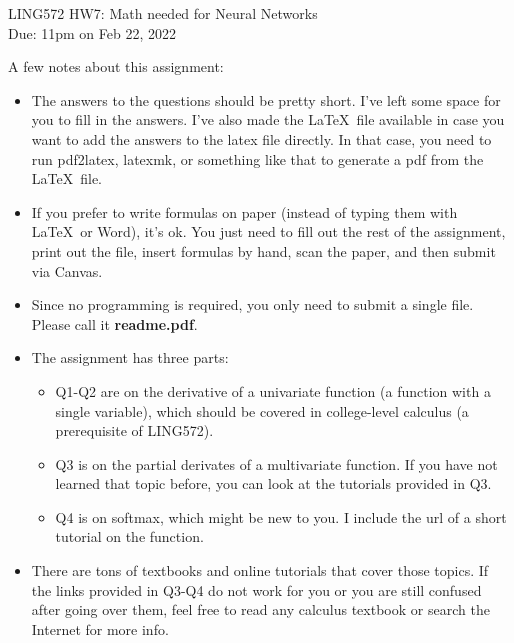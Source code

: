 \documentclass[11pt]{article}
\begin{document}
\begin{center}
\LARGE
LING572 HW7: Math needed for Neural Networks\\
Due: 11pm on Feb 22, 2022\\
\vspace{0.3in}
\end{center}

A few notes about this assignment:
\begin{itemize}

 \item The answers to the questions should be pretty short. I've left some space for you to fill in the answers. I've also made the \LaTeX \ file available in case you want to add the answers to the latex file directly. In that case, you need to run pdf2latex, latexmk, or something like that to generate a pdf from the \LaTeX \ file.

 \item If you prefer to write formulas on paper (instead of typing them with \LaTeX \ or Word), it's ok. You just need to fill out the rest of the assignment, print out the file, insert formulas by hand, scan the paper, and then submit via Canvas.

 \item Since no programming is required, you only need to submit a single
     file. Please call it {\bf readme.pdf}.

  \item The assignment has three parts:
    \begin{itemize}
    \item Q1-Q2 are on the derivative of a univariate function
      (a function with a single variable),
      which should be covered in college-level calculus (a prerequisite
      of LING572).

    \item Q3 is on the partial derivates of a multivariate function.
      If you have not learned that topic before,
      you can look at the tutorials provided in Q3.

   
    \item Q4 is on softmax, which might be new to you. I include
      the url of a short tutorial on the function.
      
    \end{itemize}


  \item There are tons of textbooks and online tutorials that cover
    those topics. If the links provided in Q3-Q4 do not work for you
    or you are still confused after going over them, feel free to
    read any calculus textbook or search the Internet for more info.

\end{itemize}
\end{document}
